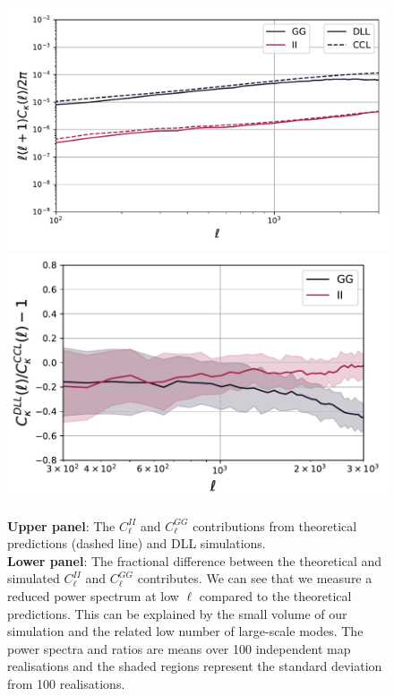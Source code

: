 \documentclass[twocolumn,twocolappendix]{aastex63}
\begin{document}
\begin{figure}
    \centering
    \includegraphics[width=0.95\columnwidth]{paper/figures/IA_validation.pdf}
    \includegraphics[width=\columnwidth]{paper/figures/IA_validation_res.pdf}
    \caption{ \textbf{Upper panel}: The $C_{\ell}^{II}$ and $C_{\ell}^{GG}$ contributions from theoretical predictions (dashed line) and DLL simulations. \\
     \textbf{Lower panel}: The fractional difference between the theoretical and simulated $C_{\ell}^{II}$ and $C_{\ell}^{GG}$ contributes.
     We can see that we measure a reduced power spectrum at low $\ell$ compared to the theoretical predictions. This can be explained by the small volume of our simulation and the related low number of large-scale modes.
     The power spectra and ratios are means over 100 independent map realisations and the shaded regions represent the standard deviation from 100 realisations.}
    \label{fig:ia_validation}
\end{figure}
\end{document}

